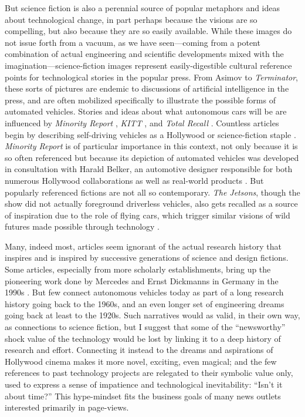
But science fiction is also a perennial source of popular metaphors and ideas
about technological change, in part perhaps because the visions are so
compelling, but also because they are so easily available. While these images
do not issue forth from a vacuum, as we have seen---coming from a potent combination
of actual engineering and scientific developments mixed with the
imagination---science-fiction images represent easily-digestible
cultural reference 
points for technological stories in the popular press. From Asimov to
\emph{Terminator}, 
these sorts of pictures are endemic to discussions of artificial
intelligence in the press, and are often mobilized specifically to
illustrate the possible forms of automated vehicles. Stories and ideas
about what autonomous cars will be are
influenced by \emph{Minority Report} \cite{fromHollywood}, \emph{KITT}
\cite{wadeKITT}, and \emph{Total
  Recall} \cite{pasdirtzSolution}. Countless articles begin by describing
self-driving vehicles as a Hollywood or science-fiction
staple \cite{scifiToReality}. \emph{Minority Report} is of particular
importance in this context, not only because it is so often referenced
but because its depiction of automated vehicles was developed in
consultation with Harald Belker, an automotive designer responsible
for both numerous Hollywood collaborations as well as real-world
products \cite{melansonMinority}. But popularly referenced fictions are
not all so contemporary. \emph{The Jetsons}, though
the show did not actually foreground driverless vehicles, also gets
recalled as a source of inspiration due to the role of flying cars,
which trigger similar visions of wild 
futures made possible through technology \cite{JetsonsAge}. 


Many, indeed most, articles seem ignorant of the actual research
history that inspires and is inspired by successive generations of
science and design fictions. Some articles, especially from more
scholarly establishments, bring up 
the pioneering work done by Mercedes and Ernst
Dickmanns in Germany in the 1990s \cite{HCRIDriverless}. But few connect
autonomous vehicles today as part of a long research history going
back to the 1960s, and an even longer set of engineering dreams going
back at least to the 1920s. Such narratives would as
valid, in their own way, as connections to science fiction, but I
suggest that some of the ``newsworthy'' shock value of the technology would be lost
by linking it to a deep history of research and effort. Connecting it
instead to the dreams and aspirations of Hollywood cinema makes it
more novel, exciting, even magical; and the few references to past
technology projects are relegated to their symbolic value only, used
to express a sense of impatience and technological inevitability: ``Isn't
it about time?'' This hype-mindset fits the business
goals of many news outlets interested primarily in page-views.

